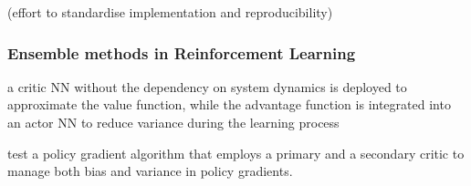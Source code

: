 \cite{shengyi2022the37implementation}(effort to standardise implementation and reproducibility)


\subsubsection*{Ensemble methods in Reinforcement Learning}

\cite{lee2021sunrise}

a critic NN without the dependency on system dynamics is deployed to approximate the value function, while the advantage function is integrated into an actor NN to reduce variance during the learning process  \cite{wang2025efficiency}

\cite{labao2018ac2} test a policy gradient algorithm that employs a primary and a secondary critic to manage both bias and variance in policy gradients. 

\cite{khan2025optimizing}


\cite{dossa2021empirical}
